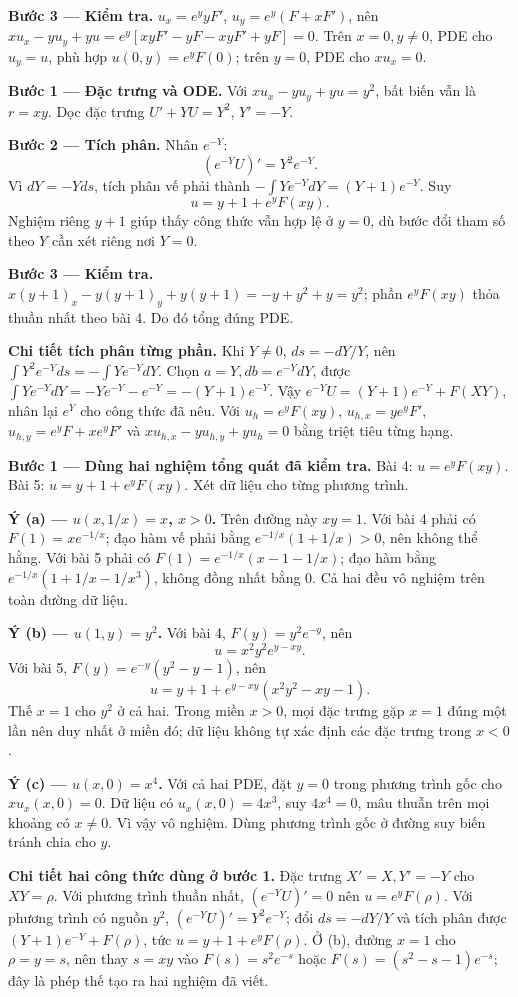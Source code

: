 \textbf{Bước 3 — Kiểm tra.} $u_x=e^y yF'$, $u_y=e^y(F+xF')$, nên $xu_x-yu_y+yu=e^y[xyF'-yF-xyF'+yF]=0$. Trên $x=0,y\ne0$, PDE cho $u_y=u$, phù hợp $u(0,y)=e^yF(0)$; trên $y=0$, PDE cho $xu_x=0$.

\textbf{Bước 1 — Đặc trưng và ODE.} Với $xu_x-yu_y+yu=y^2$, bất biến vẫn là $r=xy$. Dọc đặc trưng $U'+YU=Y^2$, $Y'=-Y$.

\textbf{Bước 2 — Tích phân.} Nhân $e^{-Y}$:
\[(e^{-Y}U)'=Y^2e^{-Y}.\]
Vì $dY=-Yds$, tích phân vế phải thành $-\int Ye^{-Y}dY=(Y+1)e^{-Y}$. Suy
\[u=y+1+e^yF(xy).\]
Nghiệm riêng $y+1$ giúp thấy công thức vẫn hợp lệ ở $y=0$, dù bước đổi tham số theo $Y$ cần xét riêng nơi $Y=0$.

\textbf{Bước 3 — Kiểm tra.} $x(y+1)_x-y(y+1)_y+y(y+1)=-y+y^2+y=y^2$; phần $e^yF(xy)$ thỏa thuần nhất theo bài 4. Do đó tổng đúng PDE.

\textbf{Chi tiết tích phân từng phần.} Khi $Y\ne0$, $ds=-dY/Y$, nên $\int Y^2e^{-Y}ds=-\int Ye^{-Y}dY$. Chọn $a=Y,db=e^{-Y}dY$, được $\int Ye^{-Y}dY=-Ye^{-Y}-e^{-Y}=-(Y+1)e^{-Y}$. Vậy $e^{-Y}U=(Y+1)e^{-Y}+F(XY)$, nhân lại $e^Y$ cho công thức đã nêu. Với $u_h=e^yF(xy)$, $u_{h,x}=ye^yF'$, $u_{h,y}=e^yF+xe^yF'$ và $xu_{h,x}-yu_{h,y}+yu_h=0$ bằng triệt tiêu từng hạng.

\textbf{Bước 1 — Dùng hai nghiệm tổng quát đã kiểm tra.} Bài 4: $u=e^yF(xy)$. Bài 5: $u=y+1+e^yF(xy)$. Xét dữ liệu cho từng phương trình.

\textbf{Ý (a) — $u(x,1/x)=x$, $x>0$.} Trên đường này $xy=1$. Với bài 4 phải có $F(1)=xe^{-1/x}$; đạo hàm vế phải bằng $e^{-1/x}(1+1/x)>0$, nên không thể hằng. Với bài 5 phải có $F(1)=e^{-1/x}(x-1-1/x)$; đạo hàm bằng $e^{-1/x}(1+1/x-1/x^3)$, không đồng nhất bằng 0. Cả hai đều vô nghiệm trên toàn đường dữ liệu.

\textbf{Ý (b) — $u(1,y)=y^2$.} Với bài 4, $F(y)=y^2e^{-y}$, nên
\[u=x^2y^2e^{y-xy}.\]
Với bài 5, $F(y)=e^{-y}(y^2-y-1)$, nên
\[u=y+1+e^{y-xy}(x^2y^2-xy-1).\]
Thế $x=1$ cho $y^2$ ở cả hai. Trong miền $x>0$, mọi đặc trưng gặp $x=1$ đúng một lần nên duy nhất ở miền đó; dữ liệu không tự xác định các đặc trưng trong $x<0$.

\textbf{Ý (c) — $u(x,0)=x^4$.} Với cả hai PDE, đặt $y=0$ trong phương trình gốc cho $xu_x(x,0)=0$. Dữ liệu có $u_x(x,0)=4x^3$, suy $4x^4=0$, mâu thuẫn trên mọi khoảng có $x\ne0$. Vì vậy vô nghiệm. Dùng phương trình gốc ở đường suy biến tránh chia cho $y$.

\textbf{Chi tiết hai công thức dùng ở bước 1.} Đặc trưng $X'=X,Y'=-Y$ cho $XY=\rho$. Với phương trình thuần nhất, $(e^{-Y}U)'=0$ nên $u=e^yF(\rho)$. Với phương trình có nguồn $y^2$, $(e^{-Y}U)'=Y^2e^{-Y}$; đổi $ds=-dY/Y$ và tích phân được $(Y+1)e^{-Y}+F(\rho)$, tức $u=y+1+e^yF(\rho)$. Ở (b), đường $x=1$ cho $\rho=y=s$, nên thay $s=xy$ vào $F(s)=s^2e^{-s}$ hoặc $F(s)=(s^2-s-1)e^{-s}$; đây là phép thế tạo ra hai nghiệm đã viết.

